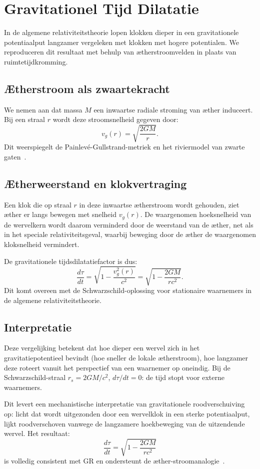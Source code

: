\section{Gravitationel Tijd Dilatatie}

In de algemene relativiteitstheorie lopen klokken dieper in een gravitationele potentiaalput langzamer vergeleken met klokken met hogere potentialen. We reproduceren dit resultaat met behulp van ætherstroomvelden in plaats van ruimtetijdkromming.

\subsection*{Ætherstroom als zwaartekracht}

We nemen aan dat massa $M$ een inwaartse radiale stroming van æther induceert. Bij een straal $r$ wordt deze stroomsnelheid gegeven door:
\[
    v_g(r) = \sqrt{\frac{2GM}{r}}.
\]
Dit weerspiegelt de Painlevé-Gullstrand-metriek en het riviermodel van zwarte gaten~\cite{Hamilton2004-river}.

\subsection*{Ætherweerstand en klokvertraging}

Een klok die op straal $r$ in deze inwaartse ætherstroom wordt gehouden, ziet æther er langs bewegen met snelheid $v_g(r)$. De waargenomen hoeksnelheid van de wervelkern wordt daarom verminderd door de weerstand van de æther, net als in het speciale relativiteitsgeval, waarbij beweging door de æther de waargenomen kloksnelheid vermindert.

De gravitationele tijdsdilatatiefactor is dus:
\[
    \frac{d\tau}{dt} = \sqrt{1 - \frac{v_g^2(r)}{c^2}} = \sqrt{1 - \frac{2GM}{rc^2}}. \tag{4}
\]
Dit komt overeen met de Schwarzschild-oplossing voor stationaire waarnemers in de algemene relativiteitstheorie.

\subsection*{Interpretatie}

Deze vergelijking betekent dat hoe dieper een wervel zich in het gravitatiepotentieel bevindt (hoe sneller de lokale ætherstroom), hoe langzamer deze roteert vanuit het perspectief van een waarnemer op oneindig. Bij de Schwarzschild-straal $r_s = 2GM/c^2$, $d\tau/dt = 0$: de tijd stopt voor externe waarnemers.

Dit levert een mechanistische interpretatie van gravitationele roodverschuiving op: licht dat wordt uitgezonden door een wervelklok in een sterke potentiaalput, lijkt roodverschoven vanwege de langzamere hoekbeweging van de uitzendende wervel. Het resultaat:
\[
    \boxed{\frac{d\tau}{dt} = \sqrt{1 - \frac{2GM}{rc^2}}}
\]
is volledig consistent met GR en ondersteunt de æther-stroomanalogie~\cite{Schiller2022-maxforce}.